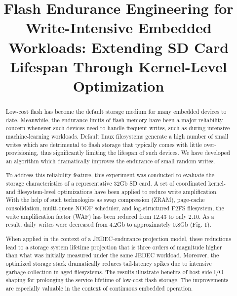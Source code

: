 \documentclass[conference]{IEEEtran}
\begin{document}
\title{Flash Endurance Engineering for Write-Intensive Embedded Workloads: Extending SD Card Lifespan Through Kernel-Level Optimization}

\author{
}

\maketitle

\begin{abstract}
Low-cost flash has become the default storage medium for many embedded devices to date. Meanwhile, the endurance limits of flash memory have been a major reliability concern whenever such devices need to handle frequent writes, such as during intensive machine-learning workloads. Default linux filesystems generate a high number of small writes which are detrimental to flash storage that typically comes with little over-provisioning, thus significantly limiting the lifespan of such devices. We have developed an algorithm which dramatically improves the endurance of small random writes.

To address this reliability feature, this experiment was conducted to evaluate the storage characteristics of a representative 32Gb SD card. A set of coordinated kernel- and filesystem-level optimizations have been applied to reduce write amplification. With the help of such technologies as swap compression (ZRAM), page-cache consolidation, multi-queue NOOP scheduler, and log-structured F2FS filesystem, the write amplification factor (WAF) has been reduced from 12.43 to only 2.10. As a result, daily writes were decreased from 4.2Gb to approximately 0.8Gb (Fig. 1).

When applied in the context of a JEDEC-endurance projection model, these reductions lead to a storage system lifetime projection that is three orders of magnitude higher than what was initially measured under the same JEDEC workload. Moreover, the optimized storage stack dramatically reduces tail-latency spikes due to intensive garbage collection in aged filesystems. The results illustrate benefits of host-side I/O shaping for prolonging the service lifetime of low-cost flash storage. The improvements are especially valuable in the context of continuous embedded operation.
\end{abstract}
\end{document}
